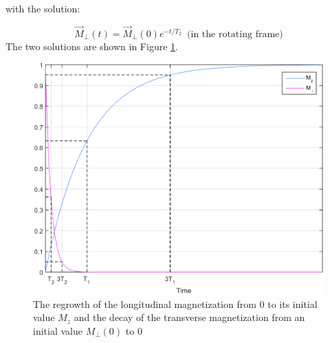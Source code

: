 with the solution:

\begin{equation} \label{eq:230}
    \vec{M}_{\perp}(t) = \vec{M}_{\perp}(0) e^{-t/T_2} \, \text{ (in the rotating frame)}
\end{equation}
The two solutions are shown in Figure \ref{fig:relax}.

\begin{figure}[ht]
    \centering
    \includegraphics[width=1\textwidth,keepaspectratio]{MzMt}
    \caption{The regrowth of the longitudinal magnetization from $0$ to its initial value $M_z$ and the decay of the transverse magnetization from an initial value $M_{\perp}(0)$ to $0$} 
    \label{fig:relax}
\end{figure}

    
    
